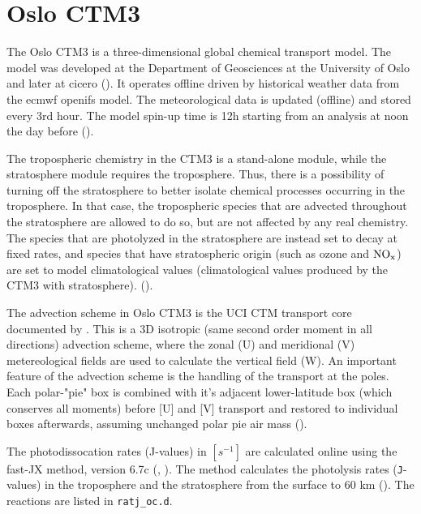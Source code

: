 \setcounter{chapter}{3}
\chapter{Oslo CTM3}\label{chapt:OsloCTM3}

The Oslo CTM3 is a three-dimensional global chemical transport model. The model was developed at the Department of Geosciences at the University of Oslo and later at \acrfull{cicero} (\cite{SovdeManual}). It operates offline driven by historical weather data from the \acrfull{ecmwf} \acrfull{openifs} model. The meteorological data is updated (offline) and stored every 3rd hour. The model spin-up time is 12h starting from an analysis at noon the day before (\cite{Sovde2012}). 

\medskip

The tropospheric chemistry in the CTM3 is a stand-alone module, while the stratosphere module requires the troposphere. Thus, there is a possibility of turning off the stratosphere to better isolate chemical processes occurring in the troposphere. In that case, the tropospheric species that are advected throughout the stratosphere are allowed to do so, but are not affected by any real chemistry. The species that are photolyzed in the stratosphere are instead set to decay at fixed rates, and species that have stratospheric origin (such as ozone and $\mathrm{NO_x}$) are set to model climatological values (climatological values produced by the CTM3 with stratosphere).  (\cite{Sovde2012}).

\medskip

The advection scheme in Oslo CTM3 is the UCI CTM transport core documented by \cite{Prather2008}. This is a 3D isotropic (same second order moment in all directions) advection scheme, where the zonal (U) and meridional (V) metereological fields are used to calculate the vertical field (W). An important feature of the advection scheme is the handling of the transport at the poles. Each polar-"pie" box is combined with it's adjacent lower-latitude box (which conserves all moments) before [U] and [V] transport and restored to individual boxes afterwards, assuming unchanged polar pie air mass (\cite{Sovde2012}). 


\medskip

The photodissocation rates (J-values) in $[s^{-1}]$ are calculated online using the fast-JX method, version 6.7c (\cite{FastJX}, \cite{SovdeManual}). The method calculates the photolysis rates (\texttt{J}-values) in the troposphere and the stratosphere from the surface to 60 km (\cite{Sovde2012}). The reactions are listed in \texttt{ratj\_oc.d}. 

